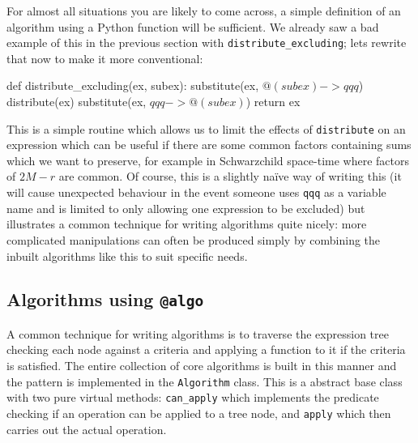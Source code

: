 \documentclass{article}
\begin{document}
For almost all situations you are likely to come across, a simple definition of an algorithm using a Python
function will be sufficient. We already saw a bad example of this in the previous section with 
\verb|distribute_excluding|; lets rewrite that now to make it more conventional:
\begin{lstcdb}
	def distribute_excluding(ex, subex):
		substitute(ex, $@(subex) -> qqq$)
		distribute(ex)
		substitute(ex, $qqq -> @(subex)$)
		return ex
\end{lstcdb}
This is a simple routine which allows us to limit the effects of \verb|distribute| on an expression which can
be useful if there are some common factors containing sums which we want to preserve, for example in
Schwarzchild space-time where factors of $2M - r$ are common. Of course, this is a slightly na\"ive way of
writing this (it will cause unexpected behaviour in the event someone uses \texttt{qqq} as a variable name and
is limited to only allowing one expression to be excluded) but illustrates a common technique for writing
algorithms quite nicely: more complicated manipulations can often be produced simply by combining the
inbuilt algorithms like this to suit specific needs. 

\subsection{Algorithms using \texttt{@algo}}

A common technique for writing algorithms is to traverse the expression tree checking each node against a criteria and applying
a function to it if the criteria is satisfied. The entire collection of core algorithms is built in this manner and the pattern
is implemented in the \texttt{Algorithm} class. This is a abstract base class with two pure virtual methods: \verb|can_apply|
which implements the predicate checking if an operation can be applied to a tree node, and \verb|apply| which then carries out
the actual operation. 
\end{document}
